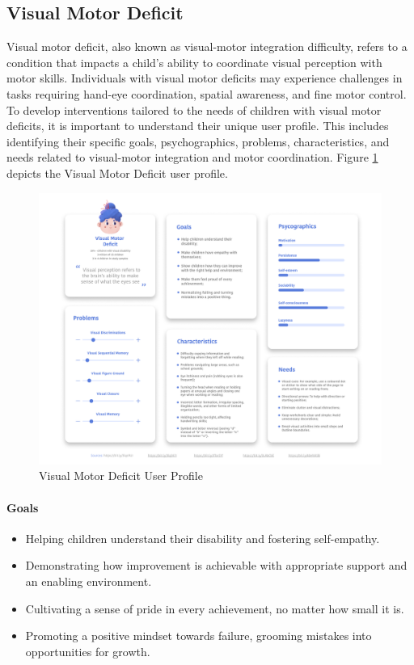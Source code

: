 \subsection{Visual Motor Deficit}
Visual motor deficit, also known as visual-motor integration difficulty, refers to a condition that impacts a child's ability to coordinate visual perception with motor skills. Individuals with visual motor deficits may experience challenges in tasks requiring hand-eye coordination, spatial awareness, and fine motor control. To develop interventions tailored to the needs of children with visual motor deficits, it is important to understand their unique user profile. This includes identifying their specific goals, psychographics, problems, characteristics, and needs related to visual-motor integration and motor coordination. Figure \ref{fig:VMDUserProfile} depicts the Visual Motor Deficit user profile.

\begin{figure}[H]
    \centering
    \includegraphics[width=1\linewidth]{Chapters/figma/Visual Motor Deficit.png}
    \caption{Visual Motor Deficit User Profile}
    \label{fig:VMDUserProfile}
\end{figure}

\paragraph{Goals}
\begin{itemize}
    \item Helping children understand their disability and fostering self-empathy.
    \item Demonstrating how improvement is achievable with appropriate support and an enabling environment.
    \item Cultivating a sense of pride in every achievement, no matter how small it is.
    \item Promoting a positive mindset towards failure, grooming mistakes into opportunities for growth.
\end{itemize}

